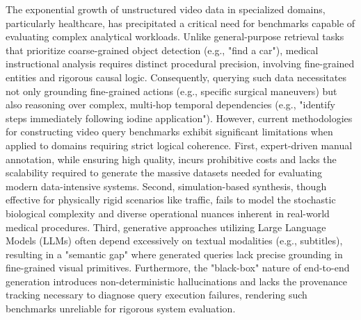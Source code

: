 The exponential growth of unstructured video data in specialized domains, particularly healthcare, has precipitated a critical need for benchmarks capable of evaluating complex analytical workloads.
Unlike general-purpose retrieval tasks that prioritize coarse-grained object detection (e.g., "find a car"), medical instructional analysis requires distinct procedural precision, involving fine-grained entities and rigorous causal logic.
Consequently, querying such data necessitates not only grounding fine-grained actions (e.g., specific surgical maneuvers) but also reasoning over complex, multi-hop temporal dependencies (e.g., "identify steps immediately following iodine application").
However, current methodologies for constructing video query benchmarks exhibit significant limitations when applied to domains requiring strict logical coherence.
First, expert-driven manual annotation, while ensuring high quality, incurs prohibitive costs and lacks the scalability required to generate the massive datasets needed for evaluating modern data-intensive systems.
Second, simulation-based synthesis, though effective for physically rigid scenarios like traffic, fails to model the stochastic biological complexity and diverse operational nuances inherent in real-world medical procedures.
Third, generative approaches utilizing Large Language Models (LLMs) often depend excessively on textual modalities (e.g., subtitles), resulting in a "semantic gap" where generated queries lack precise grounding in fine-grained visual primitives.
Furthermore, the "black-box" nature of end-to-end generation introduces non-deterministic hallucinations and lacks the provenance tracking necessary to diagnose query execution failures, rendering such benchmarks unreliable for rigorous system evaluation.
